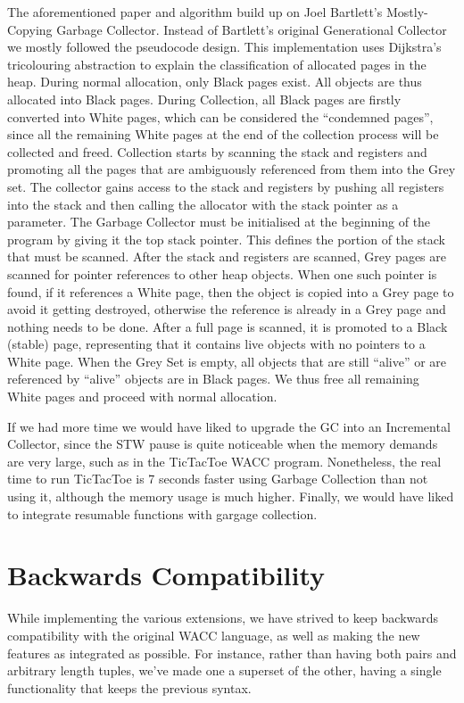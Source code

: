 \documentclass{article}
\begin{document}
The aforementioned paper and algorithm build up on Joel Bartlett's Mostly-Copying Garbage Collector. Instead of 
Bartlett's original Generational Collector we mostly followed the pseudocode design. This implementation uses Dijkstra's tricolouring 
abstraction to explain the classification of allocated pages in the heap. During normal allocation, only Black pages 
exist. All objects are thus allocated into Black pages. During Collection, all Black pages are firstly converted into White 
pages, which can be considered the ``condemned pages'', since all the remaining White pages at the end of the collection 
process will be collected and freed. Collection starts by scanning the stack and registers and promoting all the pages 
that are ambiguously referenced from them into the Grey set. The collector gains access to the stack and registers by pushing all registers into the stack and then calling the allocator with the stack pointer as a parameter. The Garbage Collector must be initialised at the beginning of the program by giving it the top stack pointer. This defines the portion of the stack that must be scanned. After the stack and registers are scanned, Grey pages are scanned for pointer references to other heap objects. When one such pointer is found, if it references a White page, then the object is copied into a Grey page to avoid it getting destroyed, otherwise the reference is already in a Grey page and nothing needs to be done. After a full page is scanned, it is promoted to a Black (stable) page, representing that it contains live objects with no pointers to a White page. When the Grey Set is empty, all objects that are still ``alive'' or are referenced by ``alive'' objects are in Black pages. We thus free all remaining White pages and proceed with normal allocation. 


If we had more time we would have liked to upgrade the GC into an Incremental Collector, since the STW pause is quite noticeable when the memory demands are very large, such as in the TicTacToe WACC program. Nonetheless, the real time to run TicTacToe is 7 seconds faster using Garbage Collection than not using it, although the memory usage is much higher. Finally, we would have liked to integrate resumable functions with gargage collection. 




\section{Backwards Compatibility}
While implementing the various extensions, we have strived to keep backwards compatibility with the original WACC language,
as well as making the new features as integrated as possible. For instance, rather than having both pairs and arbitrary length
tuples, we've made one a superset of the other, having a single functionality that keeps the previous syntax.
\end{document}
